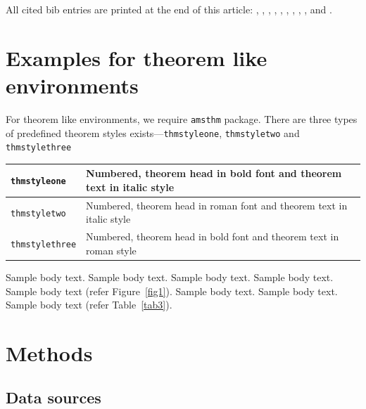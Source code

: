 \documentclass[lineno,pdflatex,sn-nature]{sn-jnl}%
\theoremstyle{thmstyleone}%
\theoremstyle{thmstyletwo}%
\theoremstyle{thmstylethree}%
\begin{document}
All cited bib entries are printed at the end of this article: \cite{bib3}, \cite{bib4}, \cite{bib5}, \cite{bib6}, \cite{bib7}, \cite{bib8}, \cite{bib9}, \cite{bib10}, \cite{bib11}, \cite{bib12} and \cite{bib13}.

\section{Examples for theorem like environments}\label{sec10}

For theorem like environments, we require \verb+amsthm+ package. There are three types of predefined theorem styles exists---\verb+thmstyleone+, \verb+thmstyletwo+ and \verb+thmstylethree+ 

\bigskip
\begin{tabular}{|l|p{19pc}|}
\hline
\verb+thmstyleone+ & Numbered, theorem head in bold font and theorem text in italic style \\\hline
\verb+thmstyletwo+ & Numbered, theorem head in roman font and theorem text in italic style \\\hline
\verb+thmstylethree+ & Numbered, theorem head in bold font and theorem text in roman style \\\hline
\end{tabular}
\bigskip



Sample body text. Sample body text. Sample body text. Sample body text. Sample body text (refer Figure~\ref{fig1}). Sample body text. Sample body text. Sample body text (refer Table~\ref{tab3}). 

\section{Methods}\label{methods}

\subsection{Data sources}
\end{document}

